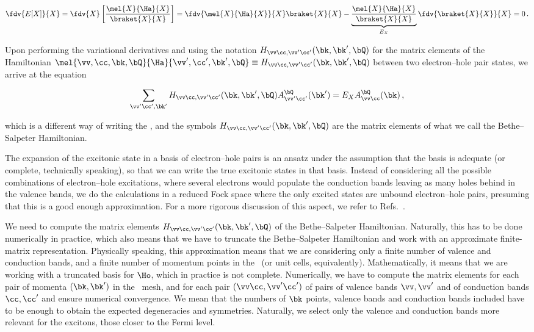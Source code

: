 \begin{equation}
\label{eq:expectation_value_exciton}
    \fdv{E[X]}{X} = \fdv{X}  \left[\frac{\mel{X}{\Ha}{X}}{\braket{X}{X}}\right] = \fdv{\mel{X}{\Ha}{X}}{X} \braket{X}{X} - \underbrace{ \frac{\mel{X}{\Ha}{X}}{\braket{X}{X}}}_{E_X}  \fdv{\braket{X}{X}}{X} = 0 \,.
\end{equation}

\noindent Upon performing the variational derivatives and using the notation $H_{\vv \cc , \vv ' \cc '}(\bk,\bk',\bQ)$ for the matrix elements of the Hamiltonian $\mel{\vv,\cc ,\bk,\bQ}{\Ha}{\vv ', \cc ',\bk',\bQ} \equiv H_{\vv \cc , \vv ' \cc '}(\bk,\bk',\bQ)$ between two electron--hole pair states, we arrive at the equation

\begin{equation}
    \label{eq:BSE_compact_form}
   \sum_{\vv ' \cc ',\bk'} H_{\vv \cc , \vv ' \cc '}(\bk,\bk',\bQ) A^{\bQ}_{\vv '\cc '}(\bk') = E_X A^{\bQ}_{\vv \cc }(\bk) \,,
\end{equation}

\noindent which is a different way of writing the \bse, and the symbols $H_{\vv \cc , \vv ' \cc '}(\bk,\bk',\bQ)$ are the matrix elements of what we call the Bethe--Salpeter Hamiltonian.

The expansion of the excitonic state in a basis of electron--hole pairs is an ansatz under the assumption that the basis is adequate (or complete, technically speaking), so that we can write the true excitonic states in that basis.
Instead of considering all the possible combinations of electron--hole excitations, where several electrons would populate the conduction bands leaving as many holes behind in the valence bands, we do the calculations in a reduced Fock space where the only excited states are unbound electron--hole pairs, presuming that this is a good enough approximation.
For a more rigorous discussion of this aspect, we refer to Refs.~\cite{Xatu,Alex_PhD}.

We need to compute the matrix elements $H_{\vv \cc , \vv ' \cc '}(\bk,\bk',\bQ)$ of the Bethe--Salpeter Hamiltonian.
Naturally, this has to be done numerically in practice, which also means that we have to truncate the Bethe--Salpeter Hamiltonian and work with an approximate finite-matrix representation.
Physically speaking, this approximation means that we are considering only a finite number of valence and conduction bands, and a finite number of momentum points in the \bz~(or unit cells, equivalently).
Mathematically, it means that we are working with a truncated basis for $\Ho$, which in practice is not complete.
Numerically, we have to compute the matrix elements for each pair of momenta $(\bk,\bk')$ in the \bz~mesh, and for each pair $(\vv \cc ,\vv '\cc ')$ of pairs of valence bands $\vv,\vv '$ and of conduction bands $\cc , \cc '$ and ensure numerical convergence.
We mean that the numbers of $\bk$ points, valence bands and conduction bands included have to be enough to obtain the expected degeneracies and symmetries.
Naturally, we select only the valence and conduction bands more relevant for the excitons, those closer to the Fermi level.

